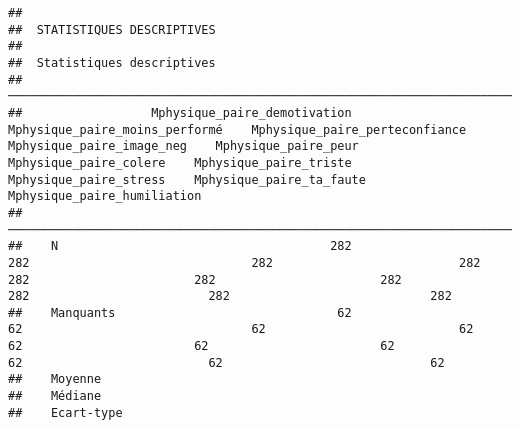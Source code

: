 \documentclass[
]{article}
\begin{document}
\begin{verbatim}
## 
##  STATISTIQUES DESCRIPTIVES
## 
##  Statistiques descriptives                                                                                                                                                                                                                                                                                        
##  ──────────────────────────────────────────────────────────────────────────────────────────────────────────────────────────────────────────────────────────────────────────────────────────────────────────────────────────────────────────────────────────────────────────────────────────────────────────────── 
##                  Mphysique_paire_demotivation    Mphysique_paire_moins_performé    Mphysique_paire_perteconfiance    Mphysique_paire_image_neg    Mphysique_paire_peur    Mphysique_paire_colere    Mphysique_paire_triste    Mphysique_paire_stress    Mphysique_paire_ta_faute    Mphysique_paire_humiliation   
##  ──────────────────────────────────────────────────────────────────────────────────────────────────────────────────────────────────────────────────────────────────────────────────────────────────────────────────────────────────────────────────────────────────────────────────────────────────────────────── 
##    N                                      282                               282                               282                          282                     282                       282                       282                       282                         282                            282   
##    Manquants                               62                                62                                62                           62                      62                        62                        62                        62                          62                             62   
##    Moyenne                                                                                                                                                                                                                                                                                                        
##    Médiane                                                                                                                                                                                                                                                                                                        
##    Ecart-type                                                                                                                                                                                                                                                                                                     

\end{verbatim}
\end{document}
